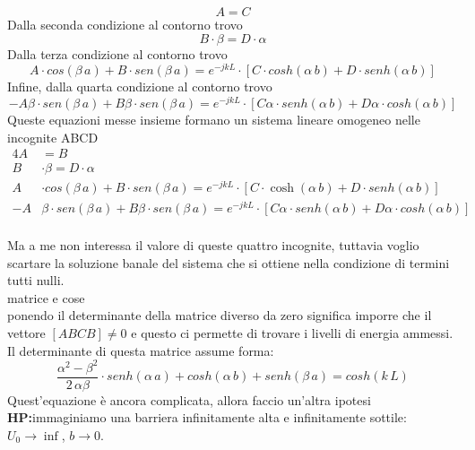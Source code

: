 \begin{equation*}
    A=C
\end{equation*}
Dalla seconda condizione al contorno trovo 
\begin{equation*}
    B \cdot \beta = D \cdot \alpha
\end{equation*}
Dalla terza condizione al contorno trovo 
\begin{equation*}
    A \cdot cos(\beta \,a) + B\cdot sen (\beta \,a)= e^{-jkL}\cdot \left[ C \cdot cosh(\alpha \,b)+D \cdot senh(\alpha \,b) \right]
\end{equation*}
Infine, dalla quarta condizione al contorno trovo 
\begin{equation*}
    -A\beta \cdot sen(\beta \,a) + B\beta \cdot sen(\beta \,a)= e^{-jkL}\cdot \left[ C\alpha \cdot senh(\alpha \,b)+D\alpha \cdot cosh(\alpha \,b) \right]
\end{equation*}
Queste equazioni messe insieme formano un sistema lineare omogeneo nelle incognite ABCD
\begin{alignat*}{4}
    A&=B \\
    B &\cdot \beta = D \cdot \alpha \\
    A &\cdot cos(\beta \,a) + B\cdot sen (\beta \,a)= e^{-jkL}\cdot \left[ C \cdot \cosh(\alpha \,b)+D \cdot senh(\alpha \,b) \right] \\
    -A&\beta \cdot sen(\beta \,a) + B\beta \cdot sen(\beta \,a)= e^{-jkL}\cdot \left[ C\alpha \cdot senh(\alpha \,b)+D\alpha \cdot cosh(\alpha \,b) \right]
\end{alignat*}
%
\\
Ma a me non interessa il valore di queste quattro incognite, tuttavia voglio scartare la soluzione banale del sistema che si ottiene nella condizione di termini tutti nulli.\\
matrice e cose\\
ponendo il determinante della matrice diverso da zero significa imporre che il vettore $[A B C B] \neq 0$ e questo ci permette di trovare i livelli di energia ammessi.\\
Il determinante di questa matrice assume forma:
\begin{equation}
    \dfrac{\alpha^2-\beta^2}{2\,\alpha \beta}\cdot senh(\alpha \,a)+cosh(\alpha \,b)+senh(\beta \,a)=cosh(k \,L)
\end{equation}
Quest'equazione è ancora complicata, allora faccio un'altra ipotesi\\
\textbf{HP:}immaginiamo una barriera infinitamente alta e infinitamente sottile: $U_0 \rightarrow \inf $, $b \rightarrow 0$.
